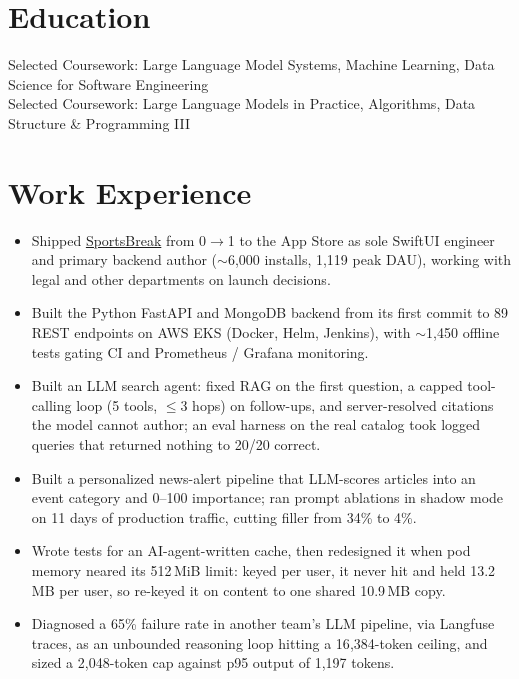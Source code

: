 \documentclass[11pt, letterpaper]{article}
\begin{document}

\section{Education}
Selected Coursework: Large Language Model Systems, Machine Learning, Data Science for Software Engineering\\[1pt]
Selected Coursework: Large Language Models in Practice, Algorithms, Data Structure \& Programming III

\section{Work Experience}
\begin{itemize}
  \item Shipped \href{https://apps.apple.com/app/id6762649287}{SportsBreak} from 0$\to$1 to the App Store as sole SwiftUI engineer and primary backend author ($\sim$6{,}000 installs, 1{,}119 peak DAU), working with legal and other departments on launch decisions.
  \item Built the Python FastAPI and MongoDB backend from its first commit to 89 REST endpoints on AWS EKS (Docker, Helm, Jenkins), with $\sim$1{,}450 offline tests gating CI and Prometheus / Grafana monitoring.
  \item Built an LLM search agent: fixed RAG on the first question, a capped tool-calling loop (5 tools, $\le$3 hops) on follow-ups, and server-resolved citations the model cannot author; an eval harness on the real catalog took logged queries that returned nothing to 20/20 correct.
  \item Built a personalized news-alert pipeline that LLM-scores articles into an event category and 0--100 importance; ran prompt ablations in shadow mode on 11 days of production traffic, cutting filler from 34\% to 4\%.
  \item Wrote tests for an AI-agent-written cache, then redesigned it when pod memory neared its 512\,MiB limit: keyed per user, it never hit and held 13.2\,MB per user, so re-keyed it on content to one shared 10.9\,MB copy.
  \item Diagnosed a 65\% failure rate in another team's LLM pipeline, via Langfuse traces, as an unbounded reasoning loop hitting a 16{,}384-token ceiling, and sized a 2{,}048-token cap against p95 output of 1{,}197 tokens.
\end{itemize}
\end{document}

